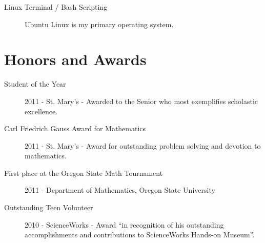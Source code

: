 \documentclass{res}
\begin{document}
\begin{resume}
\begin{description}
			\item[Linux Terminal / Bash Scripting] Ubuntu Linux is my primary operating system.

		\end{description}

	\vspace{-5pt}
	\section{Honors and Awards}

		\begin{description}

			\item[Student of the Year] 2011 - St. Mary's - Awarded to the Senior who most exemplifies scholastic excellence.

			\item[Carl Friedrich Gauss Award for Mathematics] 2011 - St. Mary's - Award for outstanding problem solving and devotion to mathematics.

			\item[First place at the Oregon State Math Tournament ] 2011 - Department of Mathematics, Oregon State University

			\item[Outstanding Teen Volunteer] 2010 - ScienceWorks - Award ``in recognition of his outstanding accomplishments and contributions
to ScienceWorks Hands-on Museum''.

		\end{description}

	\end{resume}
\end{document}
